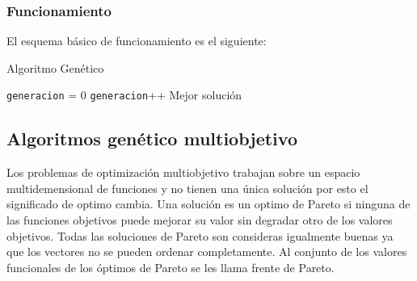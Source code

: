 \subsubsection{Funcionamiento}

El esquema básico de funcionamiento es el siguiente:


\begin{algorithm}[H]
	\caption{Algoritmo Genético}
	\label{alg:algoritmo_genetico_simple}
	\begin{algorithmic} [1] 
		{
			\STATE \texttt{generacion} = 0
			\STATE \texttt{generacion}++
			\ENDWHILE
			\RETURN Mejor solución
		}
	\end{algorithmic}
\end{algorithm}



%
%


\subsection{Algoritmos genético multiobjetivo}

Los problemas de optimización multiobjetivo trabajan sobre un espacio multidemensional de funciones y no tienen una única solución por esto el significado de optimo cambia. Una solución es un optimo de Pareto si ninguna de las funciones objetivos puede mejorar su valor sin degradar otro de los valores objetivos. Todas las soluciones de Pareto son consideras igualmente buenas ya que los vectores no se pueden ordenar completamente. Al conjunto de los valores funcionales de los óptimos de Pareto se les llama frente de Pareto.

